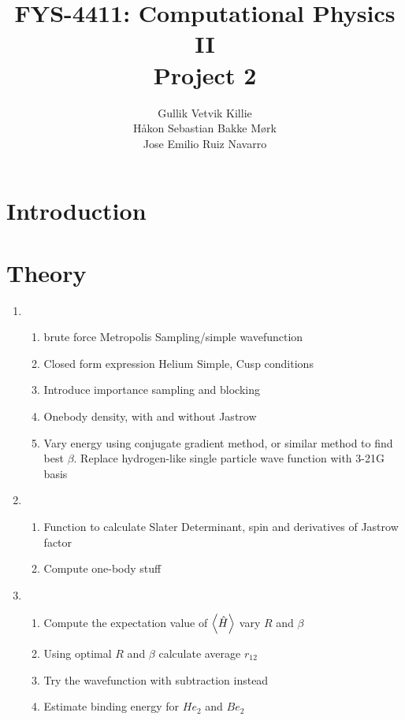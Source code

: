 \documentclass[11pt]{article}
\title{ FYS-4411: Computational Physics II \\ Project 2 }
\author{Gullik Vetvik Killie\\
		Håkon Sebastian Bakke Mørk\\
		Jose Emilio Ruiz Navarro
		}
\begin{document}
\maketitle

\tableofcontents

\section{Introduction}

\section{Theory}

\begin{enumerate}

\item
	\begin{enumerate}
		\item brute force Metropolis Sampling/simple wavefunction
		\item Closed form expression Helium Simple, Cusp conditions
		\item Introduce importance sampling and blocking
		\item Onebody density, with and without Jastrow
		\item Vary energy using conjugate gradient method, or similar method to find best \(\beta\). Replace hydrogen-like single particle wave function with 3-21G basis
	\end{enumerate}

\item
	\begin{enumerate}
		\item Function to calculate Slater Determinant, spin and derivatives of Jastrow factor
		\item Compute one-body stuff
	\end{enumerate}


\item 
	\begin{enumerate}
		\item Compute the expectation value of \( \expval{\hat{H}} \) vary \(R\) and \(\beta\)
		\item Using optimal \(R\) and \(\beta\) calculate average \(r_{12}\)
		\item Try the wavefunction with subtraction instead
		\item Estimate binding energy for \(He_{2}\) and \(Be_{2}\)
	\end{enumerate}

\end{enumerate}
\end{document}
